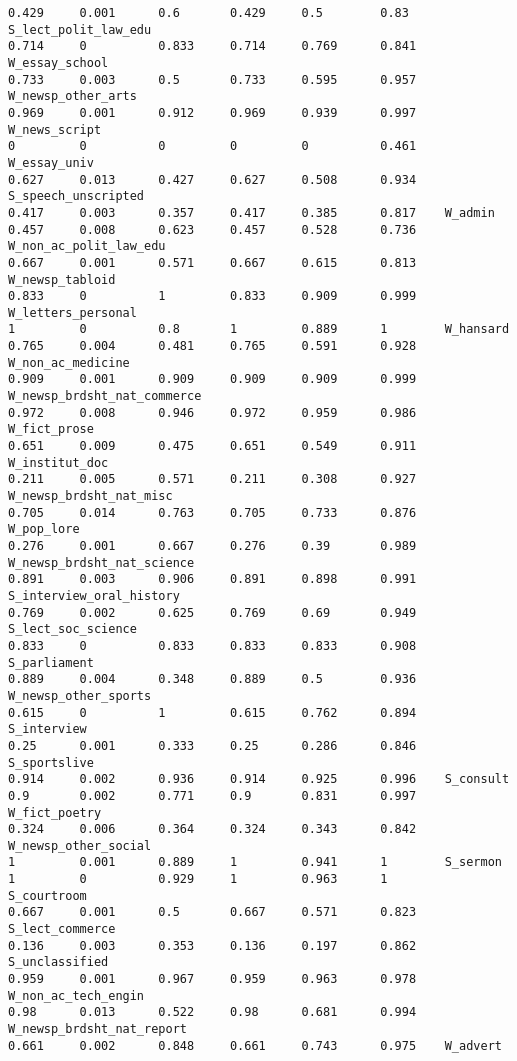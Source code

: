 {\begin{verbatim}
0.429     0.001      0.6       0.429     0.5        0.83     S_lect_polit_law_edu
0.714     0          0.833     0.714     0.769      0.841    W_essay_school
0.733     0.003      0.5       0.733     0.595      0.957    W_newsp_other_arts
0.969     0.001      0.912     0.969     0.939      0.997    W_news_script
0         0          0         0         0          0.461    W_essay_univ
0.627     0.013      0.427     0.627     0.508      0.934    S_speech_unscripted
0.417     0.003      0.357     0.417     0.385      0.817    W_admin
0.457     0.008      0.623     0.457     0.528      0.736    W_non_ac_polit_law_edu
0.667     0.001      0.571     0.667     0.615      0.813    W_newsp_tabloid
0.833     0          1         0.833     0.909      0.999    W_letters_personal
1         0          0.8       1         0.889      1        W_hansard
0.765     0.004      0.481     0.765     0.591      0.928    W_non_ac_medicine
0.909     0.001      0.909     0.909     0.909      0.999    W_newsp_brdsht_nat_commerce
0.972     0.008      0.946     0.972     0.959      0.986    W_fict_prose
0.651     0.009      0.475     0.651     0.549      0.911    W_institut_doc
0.211     0.005      0.571     0.211     0.308      0.927    W_newsp_brdsht_nat_misc
0.705     0.014      0.763     0.705     0.733      0.876    W_pop_lore
0.276     0.001      0.667     0.276     0.39       0.989    W_newsp_brdsht_nat_science
0.891     0.003      0.906     0.891     0.898      0.991    S_interview_oral_history
0.769     0.002      0.625     0.769     0.69       0.949    S_lect_soc_science
0.833     0          0.833     0.833     0.833      0.908    S_parliament
0.889     0.004      0.348     0.889     0.5        0.936    W_newsp_other_sports
0.615     0          1         0.615     0.762      0.894    S_interview
0.25      0.001      0.333     0.25      0.286      0.846    S_sportslive
0.914     0.002      0.936     0.914     0.925      0.996    S_consult
0.9       0.002      0.771     0.9       0.831      0.997    W_fict_poetry
0.324     0.006      0.364     0.324     0.343      0.842    W_newsp_other_social
1         0.001      0.889     1         0.941      1        S_sermon
1         0          0.929     1         0.963      1        S_courtroom
0.667     0.001      0.5       0.667     0.571      0.823    S_lect_commerce
0.136     0.003      0.353     0.136     0.197      0.862    S_unclassified
0.959     0.001      0.967     0.959     0.963      0.978    W_non_ac_tech_engin
0.98      0.013      0.522     0.98      0.681      0.994    W_newsp_brdsht_nat_report
0.661     0.002      0.848     0.661     0.743      0.975    W_advert

\end{verbatim}}
